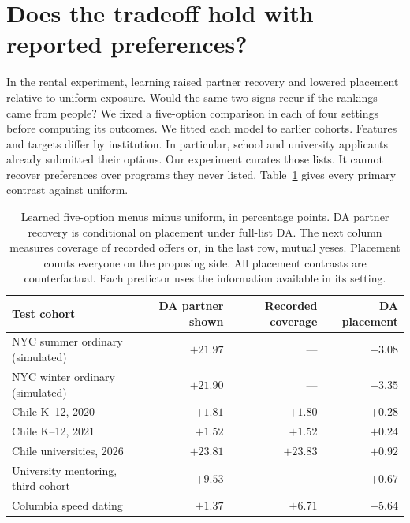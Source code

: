 \section{Does the tradeoff hold with reported preferences?}\label{sec:field}
In the rental experiment, learning raised partner recovery and lowered placement relative to uniform exposure. Would the same two signs recur if the rankings came from people? We fixed a five-option comparison in each of four settings before computing its outcomes. We fitted each model to earlier cohorts. Features and targets differ by institution. In particular, school and university applicants already submitted their options. Our experiment curates those lists. It cannot recover preferences over programs they never listed. Table~\ref{tab:field-transport} gives every primary contrast against uniform.

\begin{table}[t]\centering\small
\caption{Learned five-option menus minus uniform, in percentage points. DA partner recovery is conditional on placement under full-list DA. The next column measures coverage of recorded offers or, in the last row, mutual yeses. Placement counts everyone on the proposing side. All placement contrasts are counterfactual. Each predictor uses the information available in its setting.}
\label{tab:field-transport}\begin{tabular}{@{}lrrr@{}}\toprule
Test cohort & DA partner shown & Recorded coverage & DA placement\\\midrule
NYC summer ordinary (simulated) & $+21.97$ & --- & $-3.08$\\
NYC winter ordinary (simulated) & $+21.90$ & --- & $-3.35$\\\midrule
Chile K--12, 2020 & $+1.81$ & $+1.80$ & $+0.28$\\
Chile K--12, 2021 & $+1.52$ & $+1.52$ & $+0.24$\\
Chile universities, 2026 & $+23.81$ & $+23.83$ & $+0.92$\\
University mentoring, third cohort & $+9.53$ & --- & $+0.67$\\
Columbia speed dating & $+1.37$ & $+6.71$ & $-5.64$\\\bottomrule
\end{tabular}\end{table}


